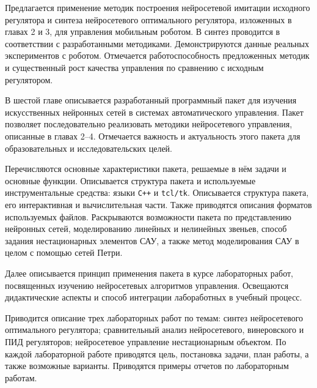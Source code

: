 Предлагается применение методик построения нейросетевой имитации
исходного регулятора и синтеза нейросетевого оптимального регулятора,
изложенных в главах 2 и 3, для управления мобильным роботом.  В синтез
проводится в соответствии с разработанными методиками.
Демонстрируются данные реальных экспериментов с роботом.  Отмечается
работоспособность предложенных методик и существенный рост качества
управления по сравнению с исходным регулятором.


В шестой главе описывается разработанный программный пакет для
изучения искусственных нейронных сетей в системах автоматического
управления.  Пакет позволяет последовательно реализовать методики
нейросетевого управления, описанные в главах 2--4.  Отмечается
важность и актуальность этого пакета для образовательных и
исследовательских целей.

Перечисляются основные характеристики пакета, решаемые в нём задачи и
основные функции.  Описывается структура пакета и используемые
инструментальные средства: языки {\tt C++} и {\tt tcl/tk}.
Описывается структура пакета, его интерактивная и вычислительная
части.  Также приводятся описания форматов используемых файлов.
Раскрываются возможности пакета по представлению нейронных сетей,
моделированию линейных и нелинейных звеньев, способ задания
нестационарных элементов САУ, а также метод моделирования САУ в целом
с помощью сетей Петри.

Далее описывается принцип применения пакета в курсе лабораторных
работ, посвященных изучению нейросетевых алгоритмов управления.
Освещаются дидактические аспекты и способ интеграции лабоработных в
учебный процесс.

Приводится описание трех лабораторных работ по темам: синтез
нейросетевого оптимального регулятора; сравнительный анализ
нейросетевого, винеровского и ПИД регуляторов; нейросетевое управление
нестационарным объектом.  По каждой лабораторной работе приводятся
цель, постановка задачи, план работы, а также возможные варианты.
Приводятся примеры отчетов по лабораторным работам.

